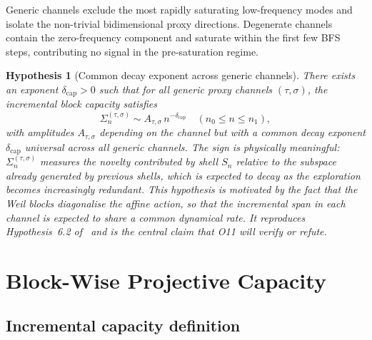 \documentclass[11pt,a4paper]{article}
\newtheorem{hypothesis}[theorem]{Hypothesis}
\newcommand{\Sigblock}{\Sigma_n^{(\tau,\sigma)}}
\newcommand{\dcap}{\delta_{\mathrm{cap}}}
\begin{document}
    Generic channels exclude the most rapidly saturating low-frequency modes and isolate the
    non-trivial bidimensional proxy directions.
    Degenerate channels contain the zero-frequency component and saturate within the first few BFS
    steps, contributing no signal in the pre-saturation regime.

    \begin{hypothesis}[Common decay exponent across generic channels]
      \label{hyp:common-slope}
      There exists an exponent $\dcap > 0$ such that for all generic proxy channels
      $(\tau, \sigma)$, the incremental block capacity satisfies
      \begin{equation}
        \label{eq:common-slope}
        \Sigblock \sim A_{\tau,\sigma}\, n^{-\dcap} \quad (n_0 \leq n \leq n_1),
      \end{equation}
      with amplitudes $A_{\tau,\sigma}$ depending on the channel but with a common decay exponent
      $\dcap$ universal across all generic channels.
      The sign is physically meaningful: $\Sigblock$ measures the novelty contributed by shell
      $S_n$ relative to the subspace already generated by previous shells, which is expected to
      decay as the exploration becomes increasingly redundant.
      This hypothesis is motivated by the fact that the Weil blocks diagonalise the affine action,
      so that the incremental span in each channel is expected to share a common dynamical rate.
      It reproduces Hypothesis~6.2 of~\cite{Beau2026a14} and is the central claim that O11 will
      verify or refute.
    \end{hypothesis}

  \section{Block-Wise Projective Capacity}
  \label{sec:blockwise}

  \subsection{Incremental capacity definition}
    \label{sec:blockwise-def}
\end{document}

